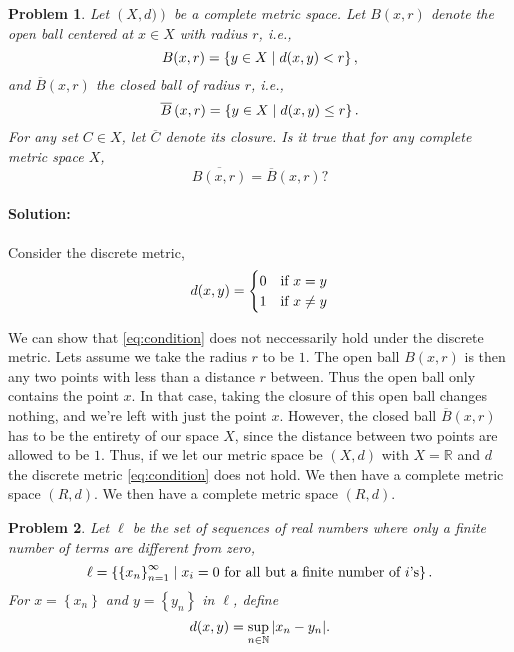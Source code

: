 \documentclass[a4paper]{article}
\newtheorem{prb}{Problem}
\begin{document}
\begin{prb}
Let $\left( X, d) \right)$ be a complete metric space. Let $B(x, r)$ denote the open ball
centered at $x \in X$ with radius $r$, i.e., 
\begin{equation}
  \notag
  B(x, r) = \left\{ y \in X \mid d(x, y) < r \right\},
\end{equation}
and $\overline{B}\left( x, r \right)$ the closed ball of radius $r$, i.e.,
\begin{equation}
  \notag
  \overline{B}\left( x, r \right) = \left\{ y \in X \mid d(x, y) \leq r \right\}.
\end{equation}
For any set $C \in X$, let $\overline{C}$ denote its closure.
Is it true that for any complete metric space $X$, 
\begin{equation}
  \label{eq:condition}
  \overline{B\left( x, r \right)} = \overline{B}\left( x, r \right)?
\end{equation}
\end{prb}

\paragraph{Solution: }

Consider the discrete metric,
\begin{equation}
  \notag
  d(x, y) = \begin{cases}
    0 & \text{if } x = y \\
    1 & \text{if } x \neq y
  \end{cases}
\end{equation}

We can show that \eqref{eq:condition} does not neccessarily hold under the
discrete metric.  Lets assume we take the radius $r$ to be $1$.  The open ball
$B(x, r)$ is then any two points with less than a distance $r$ between.  Thus
the open ball only contains the point $x$. In that case, taking the closure of
this open ball changes nothing, and we're left with just the point $x$.
However, the closed ball $\overline{B}\left( x, r \right)$ has to be the
entirety of our space $X$, since the distance between two points are allowed to
be $1$.  Thus, if we let our metric space be $(X, d)$ with $X = \mathbb{R}$ and
$d$ the discrete metric \eqref{eq:condition} does not hold. We then have a
complete metric space $(R, d)$. We then have a complete metric space $(R, d)$.

\begin{prb}
Let $\ell$ be the set of sequences of real numbers where only a finite number of terms
are different from zero,
\begin{equation}
  \notag
  \ell = \left\{ \left\{ x_n \right\}_{n=1}^{\infty} \mid x_i = 0 \text{ for all but a finite number of $i$'s} \right\}.
\end{equation}
For $x = \left\{ x_n \right\}$ and $y = \left\{ y_n \right\}$ in $\ell$, define
\begin{equation}
  \notag 
  d(x, y) = \sup_{n\in\mathbb{N}} |x_n - y_n|.
\end{equation}
\end{prb}
\end{document}
